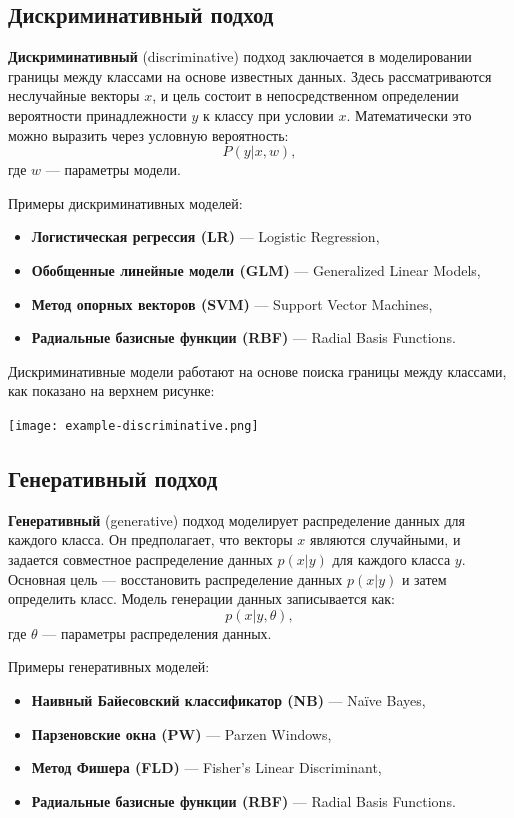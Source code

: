\subsection{Дискриминативный подход}
\textbf{Дискриминативный} (discriminative) подход заключается в моделировании границы между классами на основе известных данных. Здесь рассматриваются неслучайные векторы $x$, и цель состоит в непосредственном определении вероятности принадлежности $y$ к классу при условии $x$. Математически это можно выразить через условную вероятность:
\begin{equation}
P(y | x, w),
\end{equation}
где $w$ — параметры модели.

\noindent Примеры дискриминативных моделей:
\begin{itemize}
    \item \textbf{Логистическая регрессия (LR)} — Logistic Regression,
    \item \textbf{Обобщенные линейные модели (GLM)} — Generalized Linear Models,
    \item \textbf{Метод опорных векторов (SVM)} — Support Vector Machines,
    \item \textbf{Радиальные базисные функции (RBF)} — Radial Basis Functions.
\end{itemize}

\noindent Дискриминативные модели работают на основе поиска границы между классами, как показано на верхнем рисунке:
\begin{center}
    \texttt{[image: example-discriminative.png]} %
\end{center}

\subsection{Генеративный подход}
\textbf{Генеративный} (generative) подход моделирует распределение данных для каждого класса. Он предполагает, что векторы $x$ являются случайными, и задается совместное распределение данных $p(x|y)$ для каждого класса $y$. Основная цель — восстановить распределение данных $p(x|y)$ и затем определить класс. Модель генерации данных записывается как:
\begin{equation}
p(x | y, \theta),
\end{equation}
где $\theta$ — параметры распределения данных.

\noindent Примеры генеративных моделей:
\begin{itemize}
    \item \textbf{Наивный Байесовский классификатор (NB)} — Na\"ive Bayes,
    \item \textbf{Парзеновские окна (PW)} — Parzen Windows,
    \item \textbf{Метод Фишера (FLD)} — Fisher's Linear Discriminant,
    \item \textbf{Радиальные базисные функции (RBF)} — Radial Basis Functions.
\end{itemize}

